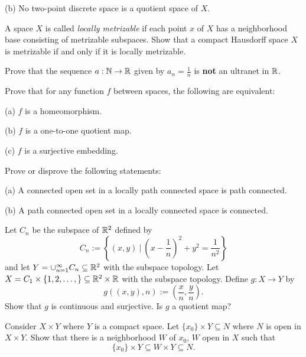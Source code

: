 \documentclass[12pt]{article}
\begin{document}
(b)  No two-point discrete space is a quotient space of $X$.

\vspace{10pt}

A space $X$ is called {\it locally metrizable} if each point $x$ of
$X$ has a neighborhood base consisting of metrizable subspaces.
Show that a compact Hausdorff space $X$ is metrizable if and only if
it is locally metrizable.

\vspace{10pt}

Prove that the sequence $a: \Bbb N\rightarrow \Bbb R$ given by
$a_n =\frac{1}{n}$ is {\bf not} an ultranet in $\Bbb R$.

\vspace{10pt}

Prove that for any function $f$ between spaces, the following are equivalent:

(a) $f$ is a homeomorphism.

(b) $f$ is a one-to-one quotient map.

(c) $f$ is a surjective embedding.

\vspace{10pt}

{}
Prove or disprove the following statements:

(a) A connected open set in a locally path connected space is path
	connected.

(b) A path connected open set in a locally connected space is
	connected.

\vspace{10pt}

\eject

Let $C_n$ be the subspace of ${\Bbb R}^2$ defined by
$$ C_n := \left\{ (x,y)\ | \
	\left(x-\frac{1}{n}\right)^2+ y^2 =\frac{1}{n^2} \right\}  $$
and let $Y=\cup_{n=1}^{\infty} C_n\subseteq {\Bbb R}^2$ with the
subspace topology. Let
$X=C_1\times \{ 1, 2, \ldots, \}\subseteq {\Bbb R}^2\times {\Bbb R}$
with the subspace topology. Define $g: X\rightarrow Y$ by
$$ g\left( (x, y), n\right)
	:= \left(\frac{x}{n}, \frac{y}{n}\right) .$$
Show that $g$ is continuous and surjective. Is $g$ a quotient map?


\vspace{10pt}
Consider $X\times Y$ where $Y$ is a compact space.
Let $\{x_0\}\times Y\subseteq N $ where $N$ is open in $X\times Y$.
Show that there is a neighborhood $W$ of $x_0$, $W$ open in $X$ such
that
$$
\{x_0\}\times Y \subseteq W\times Y\subseteq N . $$
\end{document}
